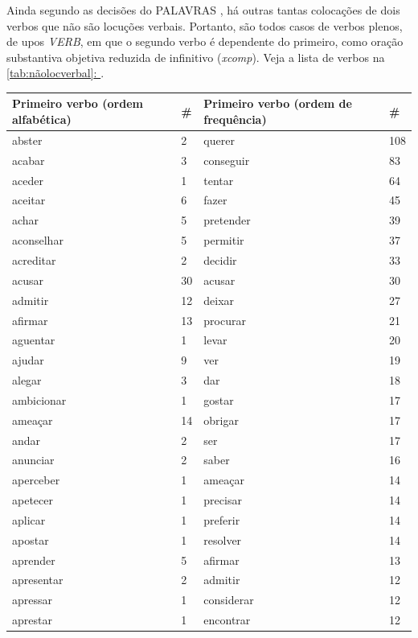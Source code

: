 \documentclass[output=paper,colorlinks,citecolor=brown]{langscibook}
\newcommand*{\fullref}[1]{\hyperref[{#1}]{\autoref*{#1}: \nameref*{#1}}} %
\begin{document}
		Ainda segundo as decisões do PALAVRAS \citep{bick2000parsing}, há outras tantas colocações de dois verbos que não são locuções verbais. Portanto, são todos casos de verbos plenos, de upos \emph{VERB}, em que o segundo verbo é dependente do primeiro, como oração substantiva objetiva reduzida de infinitivo (\emph{xcomp}). Veja a lista de verbos na \fullref{tab:nãolocverbal}.

		\begin{longtable}{ p{3cm} | p{1cm} | p{3cm} | p{1cm} }
			\hline
			\textbf{Primeiro verbo (ordem alfabética)} & \textbf{\#} & \textbf{Primeiro verbo (ordem de frequência)} & \textbf{\#} \\\hline
			abster & 2 & querer & 108\\\hline
			acabar & 3 & conseguir & 83\\\hline
			aceder & 1 & tentar & 64\\\hline
			aceitar & 6 & fazer & 45\\\hline
			achar & 5 & pretender & 39\\\hline
			aconselhar & 5 & permitir & 37\\\hline
			acreditar & 2 & decidir & 33\\\hline
			acusar & 30 & acusar & 30\\\hline
			admitir & 12 & deixar & 27\\\hline
			afirmar & 13 & procurar & 21\\\hline
			aguentar & 1 & levar & 20\\\hline
			ajudar & 9 & ver & 19\\\hline
			alegar & 3 & dar & 18\\\hline
			ambicionar & 1 & gostar & 17\\\hline
			ameaçar & 14 & obrigar & 17\\\hline
			andar & 2 & ser & 17\\\hline
			anunciar & 2 & saber & 16\\\hline
			aperceber & 1 & ameaçar & 14\\\hline
			apetecer & 1 & precisar & 14\\\hline
			aplicar & 1 & preferir & 14\\\hline
			apostar & 1 & resolver & 14\\\hline
			aprender & 5 & afirmar & 13\\\hline
			apresentar & 2 & admitir & 12\\\hline
			apressar & 1 & considerar & 12\\\hline
			aprestar & 1 & encontrar & 12\\\hline

\end{longtable}
\end{document}
